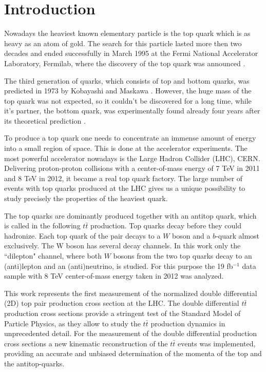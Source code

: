 \chapter{Introduction}

Nowadays the heaviest known elementary particle is the top quark which is as heavy as an atom of gold. 
The search for this particle lasted more then two decades and ended successfully 
in March 1995 at the Fermi National Accelerator Laboratory, Fermilab, where 
the discovery of the top quark was announced \cite{PhysRevLett.74.2626}. 

The third generation of quarks, which consists of top and bottom quarks, 
was predicted in 1973 by Kobayashi and Maskawa \cite{Kobayashi:1973fv}. However, the huge mass of the 
top quark was not expected, so it couldn't be discovered for a long time, while it's partner, 
the bottom quark, was experimentally found already four years after its theoretical prediction \cite{PhysRevLett.39.252}. 

To produce a top quark one needs to concentrate an immense amount of energy 
into a small region of space. This is done at the accelerator experiments. 
The most powerful accelerator nowadays is the Large Hadron Collider (LHC), CERN. 
Delivering proton-proton collisions with a center-of-mass energy of 7 TeV in 2011 and 8 TeV in 2012, 
it became a real top quark factory. The large number of events with top quarks
produced at the LHC gives us a unique possibility to study precisely the properties of the heaviest quark. 

The top quarks are dominantly produced together with an antitop quark, which is called in the 
following $t\bar{t}$ production. Top quarks decay before they could hadronize. 
Each top quark of the pair decays to a $W$ boson and a $b$-quark almost exclusively. 
The W boson has several decay channels. In this work only the ``dilepton" channel, 
where both $W$ bosons from the two top quarks decay to an (anti)lepton and an (anti)neutrino, is studied. 
For this purpose the 19 fb$^{-1}$ data sample with 8 TeV center-of-mass energy taken in 2012 was analyzed.

This work represents the first measurement of the normalized double differential (2D) top pair production
cross section at the LHC. The double differential $t\bar{t}$ production cross sections provide a stringent test of the 
Standard Model of Particle Physics, as they allow to study the $t\bar{t}$ production dynamics in unprecedented
detail. For the measurement of the double differential production cross sections a new kinematic reconstruction
of the $t\bar{t}$ events was implemented, providing an accurate and unbiased determination of the momenta of the
top and the antitop-quarks.

